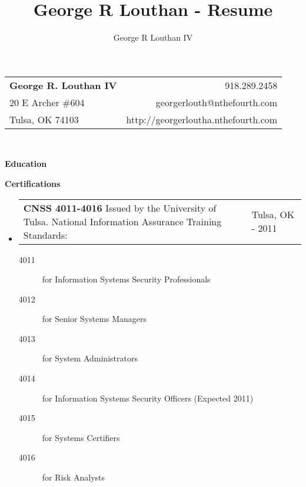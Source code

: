 \documentclass[letterpaper,11pt]{article}
\title{George R Louthan - Resume}
\author{George R Louthan IV}
\makeatletter
\newcommand{\resheading}[1]{{\large \colorbox{mygrey}{\begin{minipage}
    {\textwidth}{\textbf{#1 \vphantom{p\^{E}}}}\end{minipage}}}}
\newcommand{\resentry}[3][0pt]{
    \begin{tabular*}{0.9\textwidth}[t]{@{\hspace{#1}}p{5.0in-#1}@{\extracolsep{\fill}}p{0.75in}}
        #2 & #3
        \tabularnewline
    \end{tabular*} %
}
\newcommand{\ressubheading}[4]{
    \resentry{\textbf{#1} \newline #3}{#2 \newline #4}    
}
\newcommand{\resschool}[3]{
    \resentry{\textbf{#1} \newline #3}{#2}
}
\newcommand{\resdegree}[3]{
    \resentry[10pt]{
\setlength{\parskip}{1ex plus 0.5ex minus 0.2ex} #1 #2}{#3}
}
\newcommand{\resdegreeextra}[4]{
    \resentry[10pt]{
\setlength{\parskip}{1ex plus 0.5ex minus 0.2ex} #1 #2 \newline #4}{#3}
}
\makeatother
\begin{document}
\begin{tabular*}{7in}{l@{\extracolsep{\fill}}r}
\textbf{\Large George R. Louthan IV}  & 918.289.2458\\
20 E Archer \#604 &  georgerlouth@nthefourth.com \\
Tulsa, OK 74103 & http://georgerloutha.nthefourth.com \\
\end{tabular*}
\\

\vspace{0.1in}

\resheading{Education}

\resheading{Certifications}
\begin{itemize}
\item
	\ressubheading{CNSS 4011-4016}{Tulsa, OK}{Issued by the University of Tulsa. National Information Assurance Training Standards:}{2006 - 2011}
        \begin{description}
		\item[4011] for Information Systems Security Professionals
		\item[4012] for Senior Systems Managers
		\item[4013] for System Administrators
		\item[4014] for Information Systems Security Officers (Expected 2011)
		\item[4015] for Systems Certifiers
		\item[4016] for Risk Analysts
        \end{description}
\end{itemize}

\end{document}
